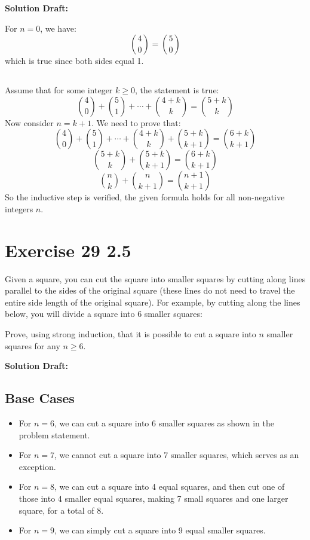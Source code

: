 \documentclass{article}
\begin{document}
\vspace{0.5cm}
\noindent\textbf{Solution Draft:} 
\vspace{0.2cm}

For \( n = 0 \), we have:
\[ {4 \choose 0} = {5 \choose 0} \]
which is true since both sides equal 1.

\subsection*{}
Assume that for some integer \( k \geq 0 \), the statement is true:
\[ {4 \choose 0} + {5 \choose 1} + \cdots + {4+k \choose k} = {5+k \choose k} \]
Now consider \( n = k + 1 \). We need to prove that:
\[ {4 \choose 0} + {5 \choose 1} + \cdots + {4+k \choose k} + {5+k \choose k+1} = {6+k \choose k+1} \]
\[ {5+k \choose k} + {5+k \choose k+1} = {6+k \choose k+1} \]
\[ {n \choose k} + {n \choose k+1} = {n+1 \choose k+1} \]
So the inductive step is verified, the given formula holds for all non-negative integers \( n \).


\section*{Exercise 29 2.5}  

Given a square, you can cut the square into smaller squares by cutting along lines parallel to the sides of the original square (these lines do not need to travel the entire side length of the original square). For example, by cutting along the lines below, you will divide a square into 6 smaller squares:

Prove, using strong induction, that it is possible to cut a square into \( n \) smaller squares for any \( n \geq 6 \).


\vspace{0.5cm}
\noindent\textbf{Solution Draft:} 
\vspace{0.2cm}

\subsection*{Base Cases}
\begin{itemize}
\item For \( n = 6 \), we can cut a square into 6 smaller squares as shown in the problem statement.
\item For \( n = 7 \), we cannot cut a square into 7 smaller squares, which serves as an exception.
\item For \( n = 8 \), we can cut a square into 4 equal squares, and then cut one of those into 4 smaller equal squares, making 7 small squares and one larger square, for a total of 8.
\item For \( n = 9 \), we can simply cut a square into 9 equal smaller squares.
\end{itemize}
\end{document}
